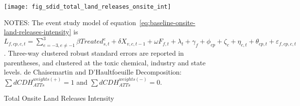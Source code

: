 \begin{figure}[H]
    \centering
    \texttt{[image: fig\_sdid\_total\_land\_releases\_onsite\_int]}
    \caption{Total Onsite Land Releases Intensity}
    \label{fig:baseline-onsite-land-releases-intensity}
    \begin{minipage}{\columnwidth}
        \vspace{0.05in}
        \tiny NOTES: The event study model of equation~\ref{eq:baseline-onsite-land-releases-intensity} is $L_{f,cp,c,t} = \sum_{{e = -3},{e \neq -1}}^{3} \beta Treated_{s,t}^e + \delta X_{v,c,t-1} + \omega F_{f,t} + \lambda_{t} + \gamma_{f} + \phi_{cp} + \zeta_{c} + \eta_{c,t} + \theta_{cp,t} + \varepsilon_{f,cp,c,t}$. Three-way clustered robust standard errors are reported in parentheses, and clustered at the toxic chemical, industry and state levels. de Chaisemartin and D'Haultfoeuille Decomposition: $\sum dCDH_{ATTs}^{weights(+)} = 1$ and $\sum dCDH_{ATTs}^{weights(-)} = 0$.
    \end{minipage}
\end{figure}